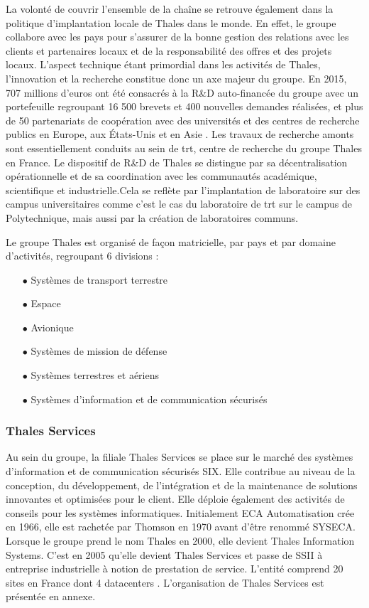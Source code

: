 La volonté de couvrir l'ensemble de la chaîne se retrouve également dans la politique d'implantation locale de Thales dans le monde. En effet, le groupe collabore avec les pays pour s'assurer de la bonne gestion des relations avec les clients et partenaires locaux et de la responsabilité des offres et des projets locaux.
L'aspect technique étant primordial dans les activités de Thales, l'innovation et la recherche constitue donc un axe majeur du groupe. En 2015, 707 millions d'euros ont été consacrés à la R\&D auto-financée du groupe avec un portefeuille regroupant 16 500 brevets et 400 nouvelles demandes réalisées, et plus de 50 partenariats de coopération avec des universités et des centres de recherche publics en Europe, aux États-Unis et en Asie \cite{ThalesSubstainability:2015}. 
Les travaux de recherche amonts sont essentiellement conduits au sein de \gls{trt}, centre de recherche du groupe Thales en France. Le dispositif de R\&D de Thales se distingue par sa décentralisation opérationnelle et de sa coordination avec les communautés académique, scientifique et industrielle.Cela se reflète par l'implantation de laboratoire sur des campus universitaires comme c'est le cas du laboratoire de \gls{trt} sur le campus de Polytechnique, mais aussi par la création de laboratoires communs.

Le groupe Thales est organisé de façon matricielle, par pays et par domaine d'activités, regroupant 6 divisions :

\begin{itemize}
\item[$\bullet$] Systèmes de transport terrestre
\item[$\bullet$] Espace
\item[$\bullet$] Avionique
\item[$\bullet$] Systèmes de mission de défense
\item[$\bullet$] Systèmes terrestres et aériens
\item[$\bullet$] Systèmes d'information et de communication sécurisés
\end{itemize}

\subsubsection{Thales Services}
Au sein du groupe, la filiale Thales Services se place sur le marché des systèmes d'information et de communication sécurisés SIX. Elle contribue au niveau de la conception, du développement, de l'intégration et de la maintenance de solutions innovantes et optimisées pour le client. Elle déploie également des activités de conseils pour les systèmes informatiques. Initialement ECA Automatisation crée en 1966, elle est rachetée par Thomson en 1970 avant d'être renommé SYSECA. Lorsque le groupe prend le nom Thales en 2000, elle devient Thales Information Systems. C'est en 2005 qu'elle devient Thales Services et passe de SSII à entreprise industrielle à notion de prestation de service. L'entité comprend 20 sites en France dont 4 datacenters \cite{ThalesSIX:2016}. L'organisation de Thales Services est présentée en annexe.
